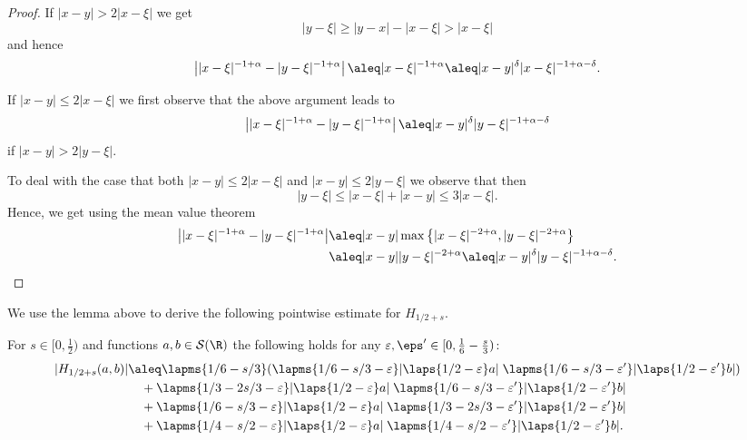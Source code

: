 \begin{proof}
 If $|x-y|>2|x-\xi|$ we get
 \begin{equation*}
  |y-\xi| \geq |y-x|-|x-\xi| %
  > |x-\xi|
 \end{equation*}
 and hence
 \begin{equation*}
  \left||x-\xi|^{-1+\alpha} - |y-\xi|^{-1+\alpha} \right| \aleq |x-\xi|^{-1+\alpha}
  \aleq |x-y|^{\delta} |x-\xi|^{-1+\alpha-\delta}.
 \end{equation*}

 If $|x-y|\leq 2 |x-\xi|$ we first observe that the above argument leads to
 \begin{equation*}
   \left||x-\xi|^{-1+\alpha} - |y-\xi|^{-1+\alpha} \right|
  \aleq |x-y|^{\delta} |y-\xi|^{-1+\alpha-\delta}
 \end{equation*}
 if $|x-y|>2|y-\xi|$.

 To deal with the case that both $|x-y|\leq 2 |x-\xi|$ and $|x-y|\leq 2 |y-\xi|$
 we observe that then
 \begin{equation*}
  |y-\xi| \leq |x-\xi| + |x-y| \leq 3 |x-\xi|.
 \end{equation*}
 Hence, we get using the mean value theorem
 \begin{align*}
   \left||x-\xi|^{-1+\alpha} - |y-\xi|^{-1+\alpha} \right|
   &\aleq |x-y| \max\left\{|x-\xi|^{-2+\alpha}, |y-\xi|^{-2+\alpha}\right\}  \\
   &\aleq |x-y| |y-\xi|^{-2+\alpha} \aleq |x-y|^\delta |y-\xi|^{-1+\alpha-\delta}.\qedhere
 \end{align*}
\end{proof}


We use the lemma above to derive the following pointwise estimate for $H_{1/2+s}$.

\begin{lemma}\label{lem:EstimateForH12s}
For $s \in [0,\frac12)$ %
and functions $a,b\in\mathcal S(\R)$
the following holds for any $\varepsilon,\eps' \in [0,\frac16-\frac s3)$:
\begin{align*}
 |H_{1/2+s}(a,b)| &\aleq \lapms{1/6-s/3} (\lapms{1/6-s/3-\varepsilon}|\laps{1/2-\varepsilon} a| \; \lapms{1/6-s/3-\varepsilon'}|\laps{1/2-\varepsilon'} b|) 
   \\ &\quad+ \lapms{1/3-2s/3-\varepsilon}|\laps{1/2-\varepsilon} a| \; \lapms{1/6-s/3-\varepsilon'}|\laps{1/2-\varepsilon'} b|
   \\ & \quad+\lapms{1/6-s/3-\varepsilon}|\laps{1/2-\varepsilon} a|\; \lapms{1/3-2s/3-\varepsilon'}|\laps{1/2-\varepsilon'} b|
   \\ & \quad+\lapms{1/4-s/2-\varepsilon}|\laps{1/2-\varepsilon} a| \; \lapms{1/4-s/2-\varepsilon'}|\laps{1/2-\varepsilon'} b|. 
\end{align*}
\end{lemma}

